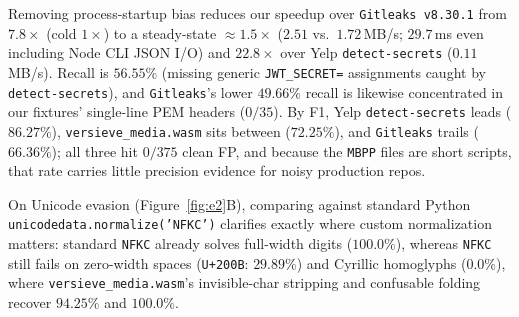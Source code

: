 \documentclass{article}
\begin{document}
\begin{table}[t]
\caption{External secret scanning ($520$ files, $10\times$ steady-state throughput excluding process startup).}
\label{tab:secrets}
\vskip 0.08in
\begin{center}
\end{center}
\vskip -0.14in
\end{table}

Removing process-startup bias reduces our speedup over \texttt{Gitleaks v8.30.1} from $7.8\times$ (cold $1\times$) to a steady-state \textbf{$\approx 1.5\times$} ($2.51$ vs.\ $1.72$\,MB/s; $29.7$\,ms even including Node CLI JSON I/O) and \textbf{$22.8\times$} over Yelp \texttt{detect-secrets} ($0.11$\,MB/s). Recall is $56.55\%$ (missing generic \texttt{JWT\_SECRET=} assignments caught by \texttt{detect-secrets}), and \texttt{Gitleaks}'s lower $49.66\%$ recall is likewise concentrated in our fixtures' single-line PEM headers ($0/35$). By F1, Yelp \texttt{detect-secrets} leads ($86.27\%$), \texttt{versieve\_media.wasm} sits between ($72.25\%$), and \texttt{Gitleaks} trails ($66.36\%$); all three hit $0/375$ clean FP, and because the \texttt{MBPP} files are short scripts, that rate carries little precision evidence for noisy production repos.

On Unicode evasion (Figure~\ref{fig:e2}B), comparing against standard Python \texttt{unicodedata.normalize('NFKC')} clarifies exactly where custom normalization matters: standard \texttt{NFKC} already solves full-width digits ($100.0\%$), whereas \texttt{NFKC} still fails on zero-width spaces (\texttt{U+200B}: $29.89\%$) and Cyrillic homoglyphs ($0.0\%$), where \texttt{versieve\_media.wasm}'s invisible-char stripping and confusable folding recover $94.25\%$ and $100.0\%$.
\end{document}
